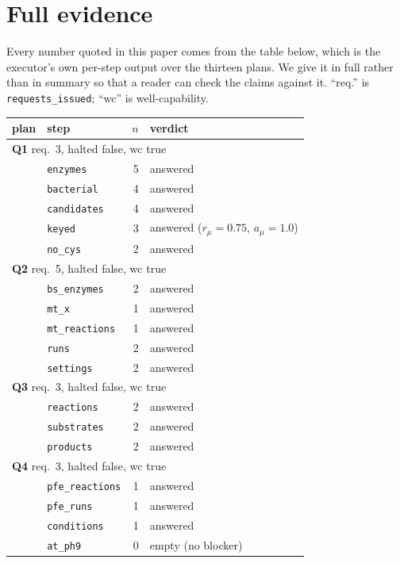 \documentclass[11pt,a4paper]{article}
\theoremstyle{plain}
\theoremstyle{definition}
\theoremstyle{remark}
\newcommand{\vans}{\textsf{answered}}
\newcommand{\vempty}{\textsf{empty}}
\begin{document}
\section{Full evidence}
\label{sec:evidence}

Every number quoted in this paper comes from the table below, which is
the executor's own per-step output over the thirteen plans. We give it
in full rather than in summary so that a reader can check the claims
against it. ``req.'' is \texttt{requests\_issued}; ``wc'' is
well-capability.

\begin{table}[H]\centering\small
\begin{tabular}{llrl}
\toprule
plan & step & $n$ & verdict \\
\midrule
\multicolumn{4}{l}{\textbf{Q1} \quad req.\ 3, halted false, wc true} \\
& \texttt{enzymes} & 5 & \vans \\
& \texttt{bacterial} & 4 & \vans \\
& \texttt{candidates} & 4 & \vans \\
& \texttt{keyed} & 3 & \vans{} \quad ($r_\mu = 0.75$, $a_\mu = 1.0$) \\
& \texttt{no\_cys} & 2 & \vans \\
\midrule
\multicolumn{4}{l}{\textbf{Q2} \quad req.\ 5, halted false, wc true} \\
& \texttt{bs\_enzymes} & 2 & \vans \\
& \texttt{mt\_x} & 1 & \vans \\
& \texttt{mt\_reactions} & 1 & \vans \\
& \texttt{runs} & 2 & \vans \\
& \texttt{settings} & 2 & \vans \\
\midrule
\multicolumn{4}{l}{\textbf{Q3} \quad req.\ 3, halted false, wc true} \\
& \texttt{reactions} & 2 & \vans \\
& \texttt{substrates} & 2 & \vans \\
& \texttt{products} & 2 & \vans \\
\midrule
\multicolumn{4}{l}{\textbf{Q4} \quad req.\ 3, halted false, wc true} \\
& \texttt{pfe\_reactions} & 1 & \vans \\
& \texttt{pfe\_runs} & 1 & \vans \\
& \texttt{conditions} & 1 & \vans \\
& \texttt{at\_ph9} & 0 & \vempty{} \quad (no blocker) \\

\end{tabular}
\end{table}
\end{document}
